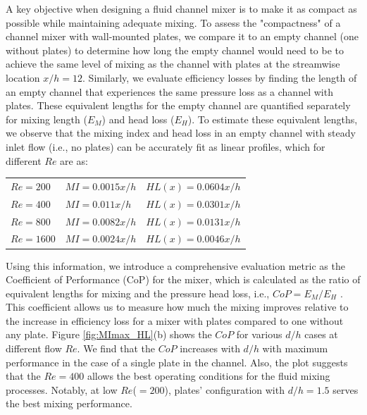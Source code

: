 \documentclass[reprint,a4paper,fleqn]{cas-dc} %
\begin{document}
		A key objective when designing a fluid channel mixer is to make it as compact as possible while maintaining adequate mixing. To assess the "compactness" of a channel mixer with wall-mounted plates, we compare it to an empty channel (one without plates) to determine how long the empty channel would need to be to achieve the same level of mixing as the channel with plates at the streamwise location $x/h = 12$. Similarly, we evaluate efficiency losses by finding the length of an empty channel that experiences the same pressure loss as a channel with plates. These equivalent lengths for the empty channel are quantified separately for mixing length ($E_M$) and head loss ($E_H$). To estimate these equivalent lengths, we observe that the mixing index and head loss in an empty channel with steady inlet flow (i.e., no plates) can be accurately fit as linear profiles, which for different $Re$ are as:
		\begin{table}[width=0.8\linewidth,cols=3,pos=h]
			\begin{tabular*}{\tblwidth}{@{} LLL@{} }
				$Re = 200$ &  $MI = 0.0015x/h$& $HL(x) = 0.0604x/h$ \\
				$Re = 400$ &   $MI = 0.011x/h$& $HL(x) = 0.0301x/h$ \\
				$Re = 800$ &   $MI = 0.0082x/h$& $HL(x) = 0.0131x/h$ \\
				$Re = 1600$ &  $MI = 0.0024x/h$& $HL(x) = 0.0046x/h$  \\
			\end{tabular*}
		\end{table}
		
		Using this information, we introduce a comprehensive evaluation metric as the Coefficient of Performance (CoP) for the mixer, which is calculated as the ratio of equivalent lengths for mixing and the pressure head loss, i.e., $CoP = E_M/E_H$ \citep{Aaron2019, Self2024}. This coefficient allows us to measure how much the mixing improves relative to the increase in efficiency loss for a mixer with plates compared to one without any plate. Figure \ref{fig:MImax_HL}(b) shows the $CoP$ for various $d/h$ cases at different flow $Re$. We find that the $CoP$ increases with $d/h$ with maximum performance in the case of a single plate in the channel. Also, the plot suggests that the $Re=400$ allows the best operating conditions for the fluid mixing processes. Notably, at low $Re$($=200$), plates' configuration with $d/h=1.5$ serves the best mixing performance.
		
\end{document}
